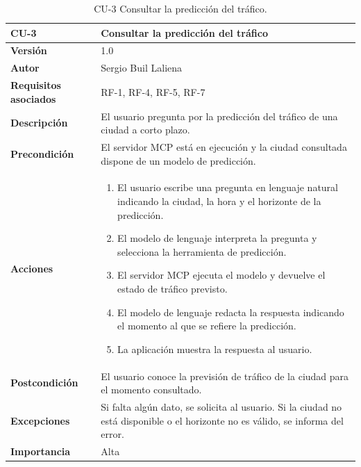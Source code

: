 \begin{table}[p]
	\centering
	\begin{tabularx}{\linewidth}{ p{} p{} }
		\toprule
		\textbf{CU-3}    & \textbf{Consultar la predicción del tráfico}\\
		\toprule
		\textbf{Versión}              & 1.0    \\
		\textbf{Autor}                & Sergio Buil Laliena \\
		\textbf{Requisitos asociados} & RF-1, RF-4, RF-5, RF-7 \\
		\textbf{Descripción}          & El usuario pregunta por la predicción del tráfico de una ciudad a corto plazo. \\
		\textbf{Precondición}         & El servidor MCP está en ejecución y la ciudad consultada dispone de un modelo de predicción. \\
		\textbf{Acciones}             &
		\begin{enumerate}
			\def\labelenumi{\arabic{enumi}.}
			\tightlist
			\item El usuario escribe una pregunta en lenguaje natural indicando la ciudad, la hora y el horizonte de la predicción.
			\item El modelo de lenguaje interpreta la pregunta y selecciona la herramienta de predicción.
			\item El servidor MCP ejecuta el modelo y devuelve el estado de tráfico previsto.
			\item El modelo de lenguaje redacta la respuesta indicando el momento al que se refiere la predicción.
			\item La aplicación muestra la respuesta al usuario.
		\end{enumerate}\\
		\textbf{Postcondición}        & El usuario conoce la previsión de tráfico de la ciudad para el momento consultado. \\
		\textbf{Excepciones}          & Si falta algún dato, se solicita al usuario. Si la ciudad no está disponible o el horizonte no es válido, se informa del error. \\
		\textbf{Importancia}          & Alta \\
		\bottomrule
	\end{tabularx}
	\caption{CU-3 Consultar la predicción del tráfico.}
	\label{tabla:cu3}
\end{table}

